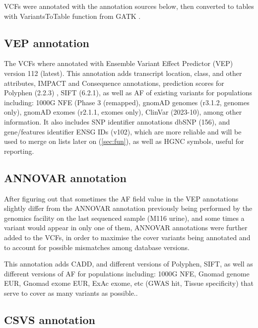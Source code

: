 \documentclass{article}\usepackage[]{graphicx}\usepackage[dvipsnames]{xcolor}
\begin{document}
VCFs were annotated with the annotation sources below, then converted to tables with VariantsToTable function from GATK \cite{mckenna2010genome}.

\subsection{VEP annotation}
\label{sec:annotvep}

The VCFs where annotated with Ensemble Variant Effect Predictor (VEP) \cite{mclaren2016ensembl} version 112 (latest). This annotation adds transcript location, class, and other attributes, IMPACT and Consequence annotations, prediction scores for Polyphen (2.2.3) , SIFT (6.2.1), as well as AF of existing variants for populations including: 1000G NFE (Phase 3 (remapped), gnomAD genomes (r3.1.2, genomes only), gnomAD exomes (r2.1.1, exomes only), ClinVar (2023-10), among other information.
It also includes SNP identifier annotations dbSNP (156), and gene/features identifier ENSG IDs (v102), which are more reliable and will be used to merge on lists later on (\autoref{sec:fun}), as well as HGNC symbols, useful for reporting.

\subsection{ANNOVAR annotation}
\label{sec:annotannovar}

After figuring out that sometimes the AF field value in the VEP annotations slightly differ from the ANNOVAR annotation previously being performed by the genomics facility on the last sequenced sample (M116 urine), and some times a variant would appear in only one of them, ANNOVAR \cite{wang2010annovar} annotations were further added to the VCFs, in order to maximise the cover variants being annotated and to account for possible mismatches among database versions. 


This annotation adds CADD, and different versions of Polyphen, SIFT, as well as different versions of AF for populations including: 1000G NFE, Gnomad genome EUR, Gnomad exome EUR, ExAc exome, etc (GWAS hit, Tissue specificity) that serve to cover as many variants as possible..


\subsection{CSVS annotation}
\label{sec:annotcsvs}
\end{document}
